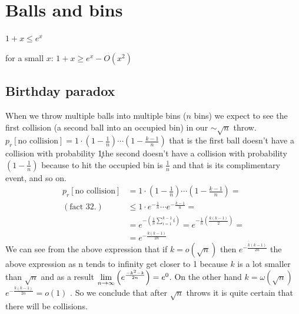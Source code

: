 \section{Balls and bins}
\begin{fact}
$1+x\le e^{x}$ 
\end{fact}

\begin{fact}
for a small $x$: $1+x\ge e^{x}-O\left(x^{2}\right)$ 
\end{fact}


\subsection{Birthday paradox}

When we throw multiple balls into multiple bins ($n$ bins) we expect
to see the first collision (a second ball into an occupied bin) in
our $\sim\sqrt{n}$ throw. $p_{r}\left[\text{no collision}\right]=1\cdot\left(1-\frac{1}{n}\right)\cdots\left(1-\frac{k-1}{n}\right)$
that is the first ball doesn't have a collision with probability 1\c{ }the
second doesn't have a collision with probability $\left(1-\frac{1}{n}\right)$
because to hit the occupied bin is $\frac{1}{n}$ and that is its
complimentary event, and so on. 
\begin{align*}
p_{r}\left[\text{no collision}\right] & =1\cdot\left(1-\frac{1}{n}\right)\cdots\left(1-\frac{k-1}{n}\right)=\\
\left(\text{fact 32.}\right) & \le1\cdot e^{-\frac{1}{n}}\cdots e^{-\frac{k-1}{n}}=\\
 & =e^{-\left(\frac{1}{n}\sum_{i=1}^{k-1}i\right)}=e^{-\frac{1}{n}\left(\frac{k\left(k-1\right)}{2}\right)}=\\
 & =e^{-\frac{k\left(k-1\right)}{2n}}
\end{align*}
 We can see from the above expression that if $k=o\left(\sqrt{n}\right)$
then $e^{-\frac{k\left(k-1\right)}{2n}}$ the above expression as
n tends to infinity get closer to 1 because $k$ is a lot smaller
than $\sqrt{n}$ and as a result $\lim\limits _{n\to\infty}\left(e^{\frac{-k^{2}-k}{2n}}\right)=e^{0}$.
On the other hand $k=\omega\left(\sqrt{n}\right)$ $e^{-\frac{k\left(k-1\right)}{2n}}=o\left(1\right)$
. So we conclude that after $\sqrt{n}$ throws it is quite certain
that there will be collisions.
